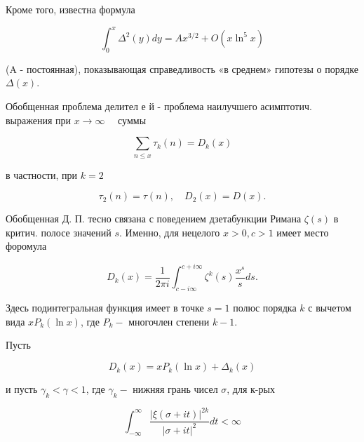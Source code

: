 \documentclass[10pt]{article}
\begin{document}
Кроме того, известна формула



\[

\int_{0}^{x} \Delta^{2}(y) d y=A x^{3 / 2}+O\left(x \ln ^{5} x\right)

\]



(A - постоянная), показывающая справедливость «в среднем» гипотезы о порядке $\Delta(x)$.



Обобщенная проблема делител е й - проблема наилучшего асимптотич. выражения при $x \rightarrow \infty \quad$ суммы



\[

\sum_{n \leqslant x} \tau_{k}(n)=D_{k}(x)

\]



в частности, при $k=2$



\[

\tau_{2}(n)=\tau(n), \quad D_{2}(x)=D(x) .

\]



Обобщенная Д. П. тесно связана с поведением дзетабункции Римана $\zeta(s)$ в критич. полосе значений $s$. Именно, для нецелого $x>0, c>1$ имеет место форомула



\[

D_{k}(x)=\frac{1}{2 \pi i} \int_{c-i \infty}^{c+i \infty} \zeta^{k}(s) \frac{x^{s}}{s} d s .

\]



Здесь подинтегральная функция имеет в точке $s=1$ полюс порядка $k$ с вычетом вида $x P_{k}(\ln x)$, где $P_{k}-$ многочлен степени $k-1$.



Пусть



\[

D_{k}(x)=x P_{k}(\ln x)+\Delta_{k}(x)

\]



и пусть $\gamma_{k}<\gamma<1$, где $\gamma_{k}-$ нижняя грань чисел $\sigma$, для к-рых



\[

\int_{-\infty}^{\infty} \frac{|\xi(\sigma+i t)|^{2 k}}{|\sigma+i t|^{2}} d t<\infty

\]
\end{document}
